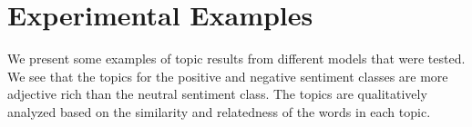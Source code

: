 \documentclass[12pt]{amsart}
\newcommand{\0}{\mat{0}}
\newcommand{\1}{\mathds{1}}
\begin{document}
\section{Experimental Examples}
We present some examples of topic results from different models that were tested. We see that the topics for the positive and negative sentiment classes are more adjective rich than the neutral sentiment class. The topics are qualitatively analyzed based on the similarity and relatedness of the words in each topic.
\bigskip 

\begin{table}[!h]
    \caption{Dirichlet Multinomial Mixture Model}
    \begin{minipage}{.5\linewidth}
      \centering

\end{minipage}
\end{table}
\end{document}
